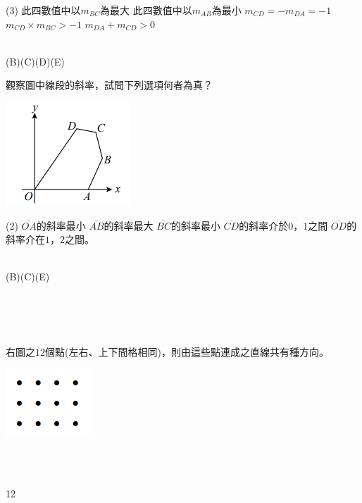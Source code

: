 \documentclass
[answers]
{exam}
\newcommand\ul[1]{\uline{\hspace*{#1}}}
\theoremstyle{definition}
\begin{document}
\begin{questions}
\begin{tasks}(3)
	\task 此四數值中以$m_{BC}$為最大
	\task 此四數值中以$m_{AB}$為最小
	\task $m_{CD} = -m_{DA}= -1$
	\task $m_{CD} \times m_{BC} > -1$
	\task $m_{DA} + m_{CD} > 0$
\end{tasks}
\begin{solution}~\\
	(B)(C)(D)(E)
\end{solution}


\question

\begin{minipage}[t]{0.7\linewidth}
	觀察圖中線段的斜率，試問下列選項何者為真？
\end{minipage}
\hfill
\begin{minipage}[t]{0.3\linewidth}
	\vspace*{-0.3cm}
	\includegraphics[scale=1]{./chapter_3/figure/4.png}
	\raggedleft %
\end{minipage}

\begin{tasks}(2)
	\task $\overline{OA}$的斜率最小
	\task $\overline{AB}$的斜率最大
	\task $\overline{BC}$的斜率最小
	\task $\overline{CD}$的斜率介於$0$，$1$之間
	\task $\overline{OD}$的斜率介在$1$，$2$之間。
\end{tasks}
\begin{solution}~\\
	(B)(C)(E)
\end{solution}

$ $\\$ $\\$ $\\
\question

\begin{minipage}[t]{0.7\linewidth}
	右圖之$12$個點(左右、上下間格相同)，則由這些點連成之直線共有\ul{50pt}種方向。
\end{minipage}
\hfill
\begin{minipage}[t]{0.3\linewidth}
	\vspace*{-0.3cm}
	\includegraphics[scale=1]{./chapter_3/figure/5.png}
	\raggedleft %
\end{minipage}
\\ 
\begin{solution}~\\
	12
\end{solution}



\end{questions}
\end{document}
